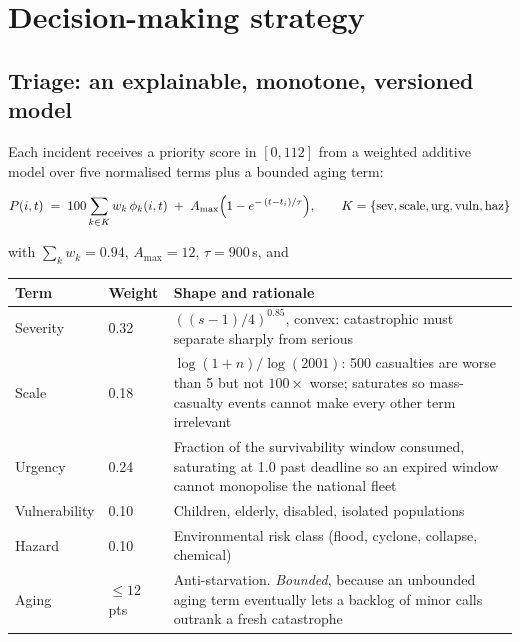 \section{Decision-making strategy}

\subsection{Triage: an explainable, monotone, versioned model}

Each incident receives a priority score in $[0,112]$ from a weighted additive
model over five normalised terms plus a bounded aging term:

\[
P(i,t) \;=\; 100\sum_{k\in K} w_k\,\phi_k(i,t)
\;+\; A_{\max}\Bigl(1-e^{-\,(t-t_i)/\tau}\Bigr),
\qquad
K=\{\text{sev},\text{scale},\text{urg},\text{vuln},\text{haz}\}
\]

\noindent with $\sum_k w_k = 0.94$, $A_{\max}=12$, $\tau=900$\,s, and

\begin{center}\footnotesize
\begin{tabular}{@{}llp{72mm}@{}}
\toprule
\textbf{Term} & \textbf{Weight} & \textbf{Shape and rationale} \\
\midrule
Severity & 0.32 & $((s-1)/4)^{0.85}$, convex: catastrophic must separate sharply from serious \\
Scale & 0.18 & $\log(1+n)/\log(2001)$: 500 casualties are worse than 5 but not $100\times$ worse; saturates so mass-casualty events cannot make every other term irrelevant \\
Urgency & 0.24 & Fraction of the survivability window consumed, saturating at 1.0 past deadline so an expired window cannot monopolise the national fleet \\
Vulnerability & 0.10 & Children, elderly, disabled, isolated populations \\
Hazard & 0.10 & Environmental risk class (flood, cyclone, collapse, chemical) \\
Aging & $\le 12$ pts & Anti-starvation. \emph{Bounded}, because an unbounded aging term eventually lets a backlog of minor calls outrank a fresh catastrophe \\
\bottomrule
\end{tabular}
\end{center}

